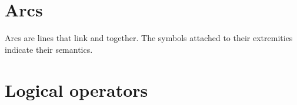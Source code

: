 







\section{Arcs}\label{sec:arcs}

Arcs are lines that link  and  together.  The symbols attached to their extremities indicate their semantics.













\section{Logical operators}\label{sec:logic}





